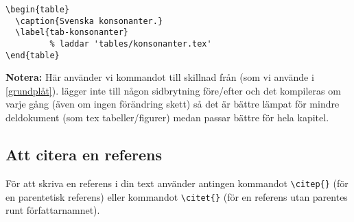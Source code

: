 \begin{verbatim}
\begin{table}
  \caption{Svenska konsonanter.}
  \label{tab-konsonanter}
         % laddar 'tables/konsonanter.tex'
\end{table}
\end{verbatim}

\textbf{Notera:} Här använder vi kommandot  till skillnad
från  (som vi använde i \autoref{grundplåt}).
 lägger inte till någon sidbrytning före/efter och det
kompileras om varje gång (även om ingen förändring skett) så det är bättre
lämpat för mindre deldokument (som tex tabeller/figurer) medan
 passar bättre för hela kapitel.


\subsection{Att citera en referens}
\label{citera}

För att skriva en referens i din text använder antingen kommandot
\texttt{\textbackslash{}citep\{\}} (för en parentetisk referens) eller
kommandot \texttt{\textbackslash{}citet\{\}} (för en referens utan parentes
runt författarnamnet).

